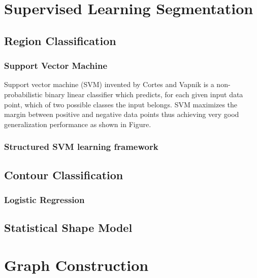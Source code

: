\documentclass{SMBV12}
\begin{document}
\section{Supervised Learning Segmentation}

\subsection{Region Classification}

\subsubsection{Support Vector Machine}

Support vector machine (SVM) invented by Cortes and Vapnik \cite{cortes1995support} is a non-probabilistic binary linear classifier which predicts, for each given input data point, which of two possible classes the input belongs. SVM maximizes the margin between positive and negative data points thus achieving very good generalization performance as shown in Figure.

\subsubsection{Structured SVM learning framework}

\cite{tsochantaridis2006large}

\subsection{Contour Classification}

\subsubsection{Logistic Regression}
\label{sec:logistic_regression}

\subsection{Statistical Shape Model}

\cite{leventon2000statistical}




\section{Graph Construction}
\end{document}
